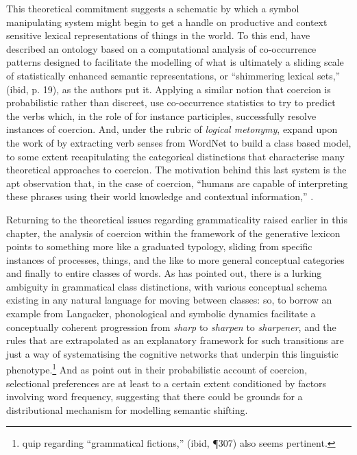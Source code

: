 This theoretical commitment suggests a schematic by which a symbol manipulating system might begin to get a handle on productive and context sensitive lexical representations of things in the world.  To this end, \cite{JezekEA2010} have described an ontology based on a computational analysis of co-occurrence patterns designed to facilitate the modelling of what is ultimately a sliding scale of statistically enhanced semantic representations, or ``shimmering lexical sets,'' (ibid, p. 19), as the authors put it.  Applying a similar notion that coercion is probabilistic rather than discreet, \cite{LapataEA2003} use co-occurrence statistics to try to predict the verbs which, in the role of for instance participles, successfully resolve instances of coercion.  And, under the rubric of \emph{logical metonymy}, \cite{ShutovaEA2013b} expand upon the work of \citeauthor{LapataEA2003} by extracting verb senses from WordNet to build a class based model, to some extent recapitulating the categorical distinctions that characterise many theoretical approaches to coercion.  The motivation behind this last system is the apt observation that, in the case of coercion, ``humans are capable of interpreting these phrases using their world knowledge and contextual information,'' \citep[][11:2]{ShutovaEA2013b}.

Returning to the theoretical issues regarding grammaticality raised earlier in this chapter, the analysis of coercion within the framework of the generative lexicon points to something more like a graduated typology, sliding from specific instances of processes, things, and the like to more general conceptual categories and finally to entire classes of words.  As \cite{Langacker1991} has pointed out, there is a lurking ambiguity in grammatical class distinctions, with various conceptual schema existing in any natural language for moving between classes: so, to borrow an example from Langacker, phonological and symbolic dynamics facilitate a conceptually coherent progression from \emph{sharp} to \emph{sharpen} to \emph{sharpener}, and the rules that are extrapolated as an explanatory framework for such transitions are just a way of systematising the cognitive networks that underpin this linguistic phenotype.\footnote{ quip regarding ``grammatical fictions,'' (ibid, \P 307) also seems pertinent.}  And as \cite{CopestakeEA1995} point out in their probabilistic account of coercion, selectional preferences are at least to a certain extent conditioned by factors involving word frequency, suggesting that there could be grounds for a distributional mechanism for modelling semantic shifting.

